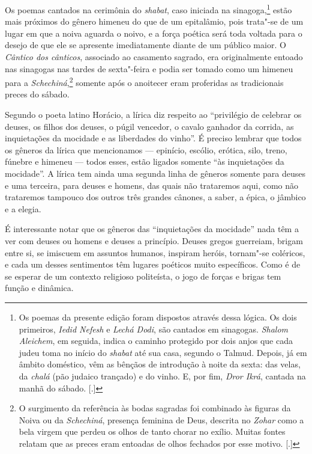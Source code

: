 Os poemas cantados na cerimônia do \emph{shabat}, caso iniciada na sinagoga,\footnote{Os poemas da presente edição foram dispostos através dessa lógica. Os dois primeiros, \emph{Iedid Nefesh} e \emph{Lechá Dodi}, são cantados em sinagogas. \emph{Shalom Aleichem}, em seguida, indica o caminho protegido por dois anjos que cada judeu toma no início do \emph{shabat} até sua casa, segundo o Talmud. Depois, já em âmbito doméstico, vêm as bênçãos de introdução à noite da sexta: das velas, da \emph{chalá} (pão judaico trançado) e do vinho. E, por fim, \emph{Dror Ikrá}, cantada na manhã do sábado. [.]}
estão mais próximos do gênero himeneu do que de um epitalâmio, pois
trata"-se de um lugar em que a noiva aguarda o noivo, e a força poética
será toda voltada para o desejo de que ele se apresente imediatamente
diante de um público maior. O \emph{Cântico dos cânticos}, associado ao
casamento sagrado, era originalmente entoado nas sinagogas nas tardes de
sexta"-feira e podia ser tomado como um himeneu para a \emph{Schechiná},\footnote{O surgimento da referência às bodas sagradas foi combinado às figuras da Noiva ou da \emph{Schechiná}, presença feminina de Deus, descrita no \emph{Zohar} como a bela virgem que perdeu os olhos de tanto chorar no exílio. Muitas fontes relatam que as preces eram entoadas de olhos fechados por esse motivo. [.]}
somente após o anoitecer eram proferidas as tradicionais preces do
sábado.

Segundo o poeta latino Horácio, a lírica diz respeito ao ``privilégio de
celebrar os deuses, os filhos dos deuses, o púgil vencedor, o cavalo
ganhador da corrida, as inquietações da mocidade e as liberdades
do vinho''. É preciso lembrar que todos os gêneros da lírica que
mencionamos --- epinício, escólio, erótica, silo, treno, fúnebre e
himeneu --- todos esses, estão ligados somente ``às inquietações da
mocidade''. A lírica tem ainda uma segunda linha de gêneros somente para
deuses e uma terceira, para deuses e homens, das quais não trataremos
aqui, como não trataremos tampouco dos outros três grandes cânones, a
saber, a épica, o jâmbico e a elegia.

É interessante notar que os gêneros das ``inquietações da mocidade'' nada
têm a ver com deuses ou homens e deuses a princípio. Deuses gregos
guerreiam, brigam entre si, se imiscuem em assuntos humanos, inspiram
heróis, tornam"-se coléricos, e cada um desses sentimentos têm lugares
poéticos muito específicos. Como é de se esperar de um contexto
religioso politeísta, o jogo de forças e brigas tem função e dinâmica.

